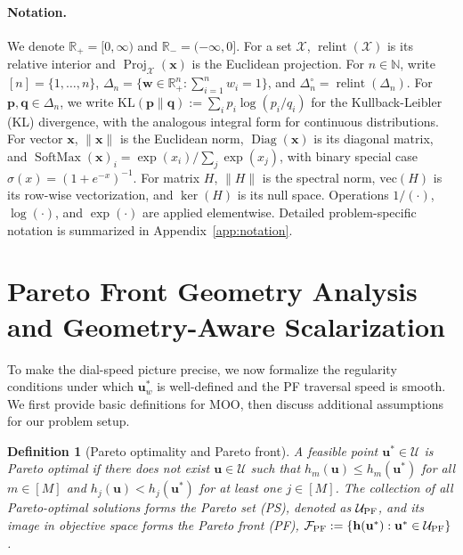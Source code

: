 \documentclass{article}
\newtheorem{definition}{Definition}
\newcommand{\bx}{\mathbf{x}}
\newcommand{\bw}{\mathbf{w}}
\newcommand{\bu}{\mathbf{u}}
\newcommand{\U}{\mathcal{U}}
\newcommand{\h}{\mathbf{h}}
\newcommand{\Diag}{\operatorname{Diag}}
\newcommand{\SoftMax}{\operatorname{SoftMax}}
\newcommand{\Proj}{\operatorname{Proj}}
\begin{document}
\paragraph{Notation.} We denote $\mathbb R_+=[0,\infty)$ and $\mathbb R_-=(-\infty,0]$. 
For a set $\mathcal X$, $\operatorname{relint}(\mathcal X)$ is its relative interior and $\Proj_{\mathcal X}(\bx)$ is the Euclidean projection. 
For $n\in\mathbb N$, write $[n]=\{1,\ldots,n\}$, $\Delta_n=\{\bw\in\mathbb R_+^n:\sum_{i=1}^n w_i=1\}$, and $\Delta_n^\circ=\operatorname{relint}(\Delta_n)$. 
For $\mathbf p,\mathbf q\in\Delta_n$, we write $\mathrm{KL}(\mathbf p\|\mathbf q):=\sum_i p_i\log(p_i/q_i)$ for the Kullback-Leibler (KL) divergence, with the analogous integral form for continuous distributions.
For vector $\bx$, $\|\bx\|$ is the Euclidean norm, $\Diag(\bx)$ is its diagonal matrix, and $\SoftMax(\bx)_i={\exp(x_i)}/{\sum_j\exp(x_j)}$, with binary special case $\sigma(x)=(1+e^{-x})^{-1}$. 
For matrix $H$, $\|H\|$ is the spectral norm, %
$\mathrm{vec}(H)$ is its row-wise vectorization, and $\ker(H)$ is its null space. 
Operations $1/(\cdot)$, $\log(\cdot)$, and $\exp(\cdot)$ are applied elementwise. 
Detailed problem-specific notation is summarized in Appendix~\ref{app:notation}.
\vspace{-0.2cm}
\section{Pareto Front Geometry Analysis and Geometry-Aware Scalarization}
\label{sec:arc-length-geometry}
\vspace{-0.2cm}
To make the dial-speed picture precise, we now formalize the regularity conditions under which $\bu_w^*$ is well-defined and the PF traversal speed is smooth.
We first provide basic definitions for MOO, then discuss additional assumptions for our problem setup. 
\begin{definition}[Pareto optimality and Pareto front]
\label{def:po_pf}
A feasible point $\bu^*\in\U$ is \emph{Pareto optimal} if there does not exist $\bu\in\U$ such that $h_m(\bu)\le h_m(\bu^*)$ for all $m\in[M]$ and $h_j(\bu)<h_j(\bu^*)$ for at least one $j\in[M]$. 
The collection of all Pareto-optimal solutions forms the \emph{Pareto set} (PS), denoted as $\U_{\rm PF}$, and its image in objective space forms the \emph{Pareto front} (PF), $\mathcal F_{\rm PF}:=\{\h(\bu^*):\bu^*\in\U_{\rm PF}\}$.    
\end{definition}
\end{document}
